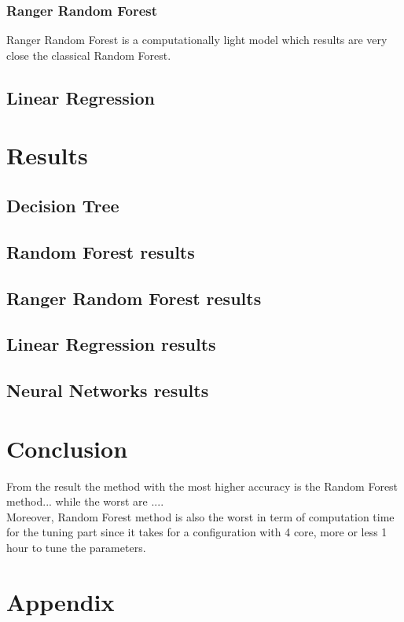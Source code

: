 \documentclass{FR16}
\begin{document}
\subsubsection{Ranger Random Forest}
Ranger Random Forest is a computationally light model which results are very close the classical Random Forest.
\\

\subsection{Linear Regression}



\newpage
\section{Results}
\subsection{Decision Tree}
\subsection{Random Forest results}
\subsection{Ranger Random Forest results}
\subsection{Linear Regression results}
\subsection{Neural Networks results}
\newpage
\section{Conclusion}
From the result the method with the most higher accuracy is the Random Forest method... while the worst are ....
\\Moreover, Random Forest method is also the worst in term of computation time for the tuning part since it takes for a configuration with 4 core, more or less 1 hour to tune the parameters. 


\newpage
\section{Appendix}
\end{document}
